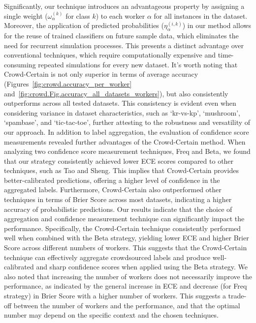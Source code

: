 \documentclass[default]{bst/sn-jnl_mine}%
\begin{document}
Significantly, our technique introduces an advantageous property by assigning a single weight ($\omega_{\alpha}^{(k)}$ for class $k$) to each worker $\alpha$ for all instances in the dataset. Moreover, the application of predicted probabilities ($\eta_{\alpha}^{(i,k)}$) in our method allows for the reuse of trained classifiers on future sample data, which eliminates the need for recurrent simulation processes. This presents a distinct advantage over conventional techniques, which require computationally expensive and time-consuming repeated simulations for every new dataset. It's worth noting that Crowd-Certain is not only superior in terms of average accuracy (Figures~\ref{fig:crowd.accuracy_per_worker} and~\ref{fig:crowd.Fig.accuracy_all_datasets_workers}), but also consistently outperforms across all tested datasets. This consistency is evident even when considering variance in dataset characteristics, such as `kr-vs-kp', `mushroom', `spambase', and `tic-tac-toe', further attesting to the robustness and versatility of our approach.
In addition to label aggregation, the evaluation of confidence score measurements revealed further advantages of the Crowd-Certain method. When analyzing two confidence score measurement techniques, Freq and Beta, we found that our strategy consistently achieved lower ECE scores compared to other techniques, such as Tao and Sheng. This implies that Crowd-Certain provides better-calibrated predictions, offering a higher level of confidence in the aggregated labels. Furthermore, Crowd-Certain also outperformed other techniques in terms of Brier Score across most datasets, indicating a higher accuracy of probabilistic predictions.
Our results indicate that the choice of aggregation and confidence measurement technique can significantly impact the performance. Specifically, the Crowd-Certain technique consistently performed well when combined with the Beta strategy, yielding lower ECE and higher Brier Score across different numbers of workers. This suggests that the Crowd-Certain technique can effectively aggregate crowdsourced labels and produce well-calibrated and sharp confidence scores when applied using the Beta strategy. We also noted that increasing the number of workers does not necessarily improve the performance, as indicated by the general increase in ECE and decrease (for Freq strategy) in Brier Score with a higher number of workers. This suggests a trade-off between the number of workers and the performance, and that the optimal number may depend on the specific context and the chosen techniques.
\end{document}
